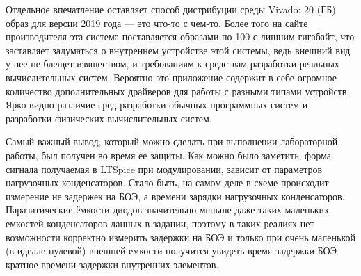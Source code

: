 Отдельное впечатление оставляет способ дистрибуции среды Vivado: 20 (ГБ) образ
для версии 2019 года --- это что-то с чем-то. Более того на сайте производителя
эта система поставляется образами по 100 с лишним гигабайт, что заставляет
задуматься о внутреннем устройстве этой системы, ведь внешний вид у нее не
блещет изяществом, и требованиям к средствам разработки реальных вычислительных
систем. Вероятно это приложение содержит в себе огромное количество
дополнительных драйверов для работы с разными типами устройств. Ярко видно
различие сред разработки обычных программных систем и разработки физических
вычислительных систем.

Самый важный вывод, который можно сделать при выполнении лабораторной работы,
был получен во время ее защиты. Как можно было заметить, форма сигнала
получаемая в LTSpice при модулировании, зависит от параметров нагрузочных
конденсаторов. Стало быть, на самом деле в схеме происходит измерение не задержек 
на БОЭ, а времени зарядки нагрузочных конденсаторов. Паразитические ёмкости
диодов значительно меньше даже таких маленьких емкостей конденсаторов данных в
задании, поэтому в таких реалиях нет возможности корректно измерить задержки на
БОЭ и только при очень маленькой (в идеале нулевой) внешней емкости получится
увидеть время задержки БОЭ кратное времени задержки внутренних элементов.








